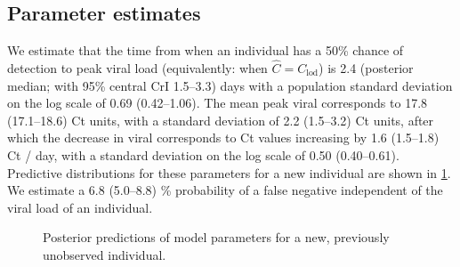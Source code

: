\documentclass[thesis.tex]{subfiles}
\begin{document}
\subsection{Parameter estimates}

We estimate that the time from when an individual has a 50\% chance of detection to peak viral load (equivalently: when $\hat{C} = C_\text{lod}$) is 2.4 (posterior median; with 95\% central CrI 1.5--3.3) days with a population standard deviation on the log scale of 0.69 (0.42--1.06).
The mean peak viral corresponds to 17.8 (17.1--18.6) Ct units, with a standard deviation of 2.2 (1.5--3.2) Ct units, after which the decrease in viral corresponds to Ct values increasing by 1.6 (1.5--1.8) Ct / day, with a standard deviation on the log scale of 0.50 (0.40--0.61).
Predictive distributions for these parameters for a new individual are shown in \cref{fig:paper:indiv_predict}.
We estimate a 6.8 (5.0--8.8) \% probability of a false negative independent of the viral load of an individual.

\begin{figure}
    \centering
    \caption[Posterior predictive viral load.]{Posterior predictions of model parameters for a new, previously unobserved individual.}
    \label{fig:paper:indiv_predict}
\end{figure}
\end{document}
